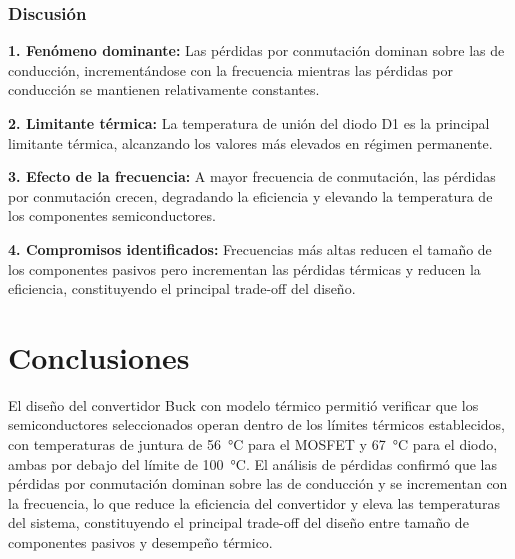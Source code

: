 \documentclass[journal]{IEEEtran}
\begin{document}
\subsubsection{Discusión}

\textbf{1. Fenómeno dominante:} Las pérdidas por conmutación dominan sobre las de conducción, incrementándose con la frecuencia mientras las pérdidas por conducción se mantienen relativamente constantes.

\textbf{2. Limitante térmica:} La temperatura de unión del diodo D1 es la principal limitante térmica, alcanzando los valores más elevados en régimen permanente.

\textbf{3. Efecto de la frecuencia:} A mayor frecuencia de conmutación, las pérdidas por conmutación crecen, degradando la eficiencia y elevando la temperatura de los componentes semiconductores.

\textbf{4. Compromisos identificados:} Frecuencias más altas reducen el tamaño de los componentes pasivos pero incrementan las pérdidas térmicas y reducen la eficiencia, constituyendo el principal trade-off del diseño.



\section{Conclusiones}
El diseño del convertidor Buck con modelo térmico permitió verificar que los semiconductores seleccionados operan dentro de los límites térmicos establecidos, con temperaturas de juntura de 56~°C para el MOSFET y 67~°C para el diodo, ambas por debajo del límite de 100~°C. El análisis de pérdidas confirmó que las pérdidas por conmutación dominan sobre las de conducción y se incrementan con la frecuencia, lo que reduce la eficiencia del convertidor y eleva las temperaturas del sistema, constituyendo el principal trade-off del diseño entre tamaño de componentes pasivos y desempeño térmico.


\printbibliography
\end{document}
